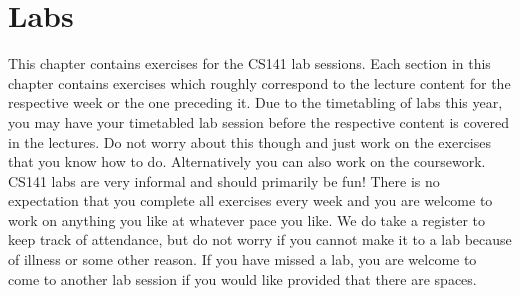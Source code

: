 \documentclass[12pt,a4paper,twoside,fleqn]{report}
\author{Michael B. Gale}
\begin{document}
\pagestyle{empty}

\renewcommand{\headrulewidth}{0pt}
\renewcommand{\footrulewidth}{0pt}



\cleardoublepage

\fancyhf{}
\fancyfoot[LE,RO]{\thepage}
\pagestyle{fancy}
\thispagestyle{fancy}

\tableofcontents


\cleardoublepage
{}









\cleardoublepage
\chapter{Labs}

This chapter contains exercises for the CS141 lab sessions. Each section in this chapter contains exercises which roughly correspond to the lecture content for the respective week or the one preceding it. Due to the timetabling of labs this year, you may have your timetabled lab session before the respective content is covered in the lectures. Do not worry about this though and just work on the exercises that you know how to do. Alternatively you can also work on the coursework. CS141 labs are very informal and should primarily be fun! There is no expectation that you complete all exercises every week and you are welcome to work on anything you like at whatever pace you like. We do take a register to keep track of attendance, but do not worry if you cannot make it to a lab because of illness or some other reason. If you have missed a lab, you are welcome to come to another lab session if you would like provided that there are spaces.

%
%
 \newpage

%
%
 \newpage

%
%

\end{document}
